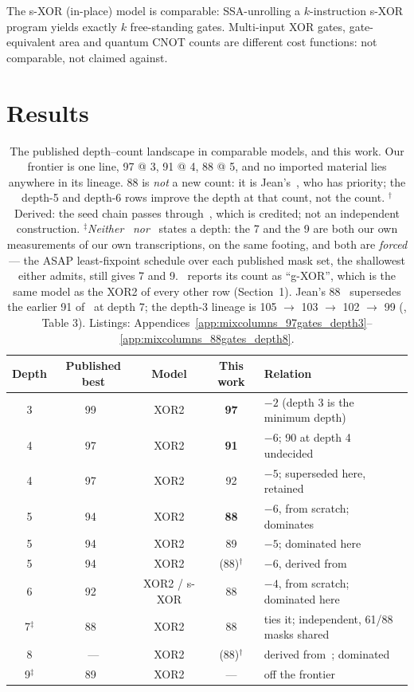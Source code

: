 \documentclass[11pt,a4paper]{article}
\begin{document}
The s-XOR (in-place) model is comparable: SSA-unrolling a $k$-instruction s-XOR
program yields exactly $k$ free-standing gates. Multi-input XOR gates,
gate-equivalent area and quantum CNOT counts are different cost functions: not
comparable, not claimed against.

\section{Results}
\label{sec:results}

\begin{table}[tb]
\centering\small
\begin{tabular}{ccccl}
\toprule
Depth & Published best & Model & This work & Relation \\
\midrule
3 & 99~\cite{SFX23} & XOR2 & \textbf{97} & $-2$ (depth 3 is the minimum depth) \\
4 & 97~\cite{OC24} & XOR2 & \textbf{91} & $-6$; 90 at depth 4 undecided \\
4 & 97~\cite{OC24} & XOR2 & 92 & $-5$; superseded here, retained \\
5 & 94~\cite{OC24} & XOR2 & \textbf{88} & $-6$, from scratch; dominates~\cite{Jean26} \\
5 & 94~\cite{OC24} & XOR2 & 89 & $-5$; dominated here \\
5 & 94~\cite{OC24} & XOR2 & (88)$^{\dagger}$ & $-6$, derived from~\cite{Jean26} \\
6 & 92~\cite{Max19,XZLBZ20} & XOR2 / s-XOR & 88 & $-4$, from scratch; dominated here \\
7$^{\ddagger}$ & 88~\cite{Jean26} & XOR2 & 88 & ties it; independent, 61/88 masks shared \\
8 & --- & XOR2 & (88)$^{\dagger}$ & derived from~\cite{Jean26}; dominated \\
9$^{\ddagger}$ & 89~\cite{SYL25} & XOR2 & --- & off the frontier \\
\bottomrule
\end{tabular}
\caption{The published depth--count landscape in comparable models, and this
work. Our frontier is one line, 97 @ 3, 91 @ 4, 88 @ 5, and no imported material
lies anywhere in its lineage. 88 is \emph{not} a new count: it is
Jean's~\cite{Jean26}, who has priority; the depth-5 and depth-6 rows improve the
depth at that count, not the count.
$^{\dagger}$Derived: the seed chain passes through~\cite{Jean26}, which is
credited; not an independent construction.
$^{\ddagger}$\emph{Neither}~\cite{Jean26} \emph{nor}~\cite{SYL25}
states a depth: the 7 and the 9 are both our own measurements of our own
transcriptions, on the same footing, and both are \emph{forced} --- the ASAP
least-fixpoint schedule over each published mask set, the shallowest either
admits, still gives 7 and 9. \cite{SYL25}~reports its count as ``g-XOR'', which
is the same model as the XOR2 of every other row (Section~1).
Jean's 88~\cite{Jean26} supersedes the earlier 91
of~\cite{LXZZ21,YWSZZ24} at depth 7; the depth-3 lineage is 105 $\rightarrow$
103 $\rightarrow$ 102 $\rightarrow$ 99 (\cite{SFX23}, Table 3). Listings:
Appendices~\ref{app:mixcolumns_97gates_depth3}--\ref{app:mixcolumns_88gates_depth8}.}
\end{table}
\end{document}
